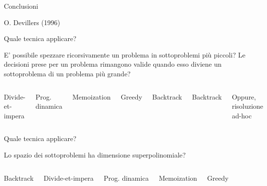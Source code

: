 \begin{frame}{Conclusioni}




O. Devillers (1996)

\end{frame}


\begin{frame}{Quale tecnica applicare?}

\vspace{-9pt}
\begin{myboxtitle}
E' possibile spezzare ricorsivamente un problema in sottoproblemi più piccoli? Le decisioni prese per un problema rimangono valide quando esso diviene un sottoproblema di un problema più grande?
\end{myboxtitle}


\vspace{-9pt}
\begin{columns}[T]
\BIL
\item Divide-et-impera
\item Prog. dinamica
\item Memoization
\item Greedy
\item Backtrack
\EIL
{}
\BIL
\item Backtrack
\item Oppure, risoluzione ad-hoc
\EIL
\end{columns}

\end{frame}

\begin{frame}{Quale tecnica applicare?}

\vspace{-9pt}
\begin{myboxtitle}
Lo spazio dei sottoproblemi ha dimensione superpolinomiale?
\end{myboxtitle}

\vspace{-9pt}
\begin{columns}[T]

\BIL
\item Backtrack
\EIL

\BIL
\item Divide-et-impera
\item Prog. dinamica
\item Memoization
\item Greedy
\EIL

\end{columns}

\end{frame}


